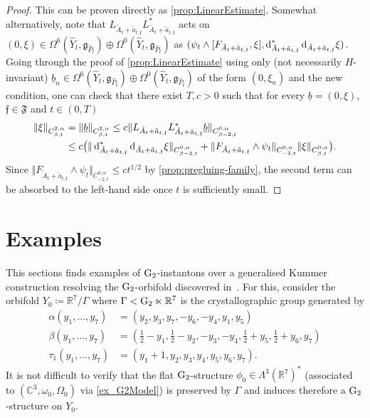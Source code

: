 \documentclass[11pt,a4paper]{scrartcl}
\newcommand*\diff{\mathop{}\!\textup{d}}
\newcommand{\VertWHt}[3]{\Vert_{C^{{#1},\alpha}_{{#2},t}{#3}}}
\newcommand{\G}{\textup{G}}
\numberwithin{equation}{section}
\theoremstyle{plain}
\theoremstyle{definition}
\theoremstyle{remark}
\begin{document}
\begin{proof}
This can be proven directly as \autoref{prop:LinearEstimate}. Somewhat alternatively, note that $L_{\tilde{A}_t+\tilde{a}_{t,\mathfrak{f}}}L_{\tilde{A}_t+\tilde{a}_{t,\mathfrak{f}}}^*$ acts on $(0,\xi)\in\Omega^6(\hat{Y}_t,\mathfrak{g}_{\hat{P}_t})\oplus \Omega^0(\hat{Y}_t,\mathfrak{g}_{\hat{P}_t})$ as $(\psi_t \wedge [F_{\tilde{A}_t+\tilde{a}_{t,\mathfrak{f}}},\xi],\diff_{\tilde{A}_t+\tilde{a}_{t,\mathfrak{f}}}^*\diff_{\tilde{A}_t+\tilde{a}_{t,\mathfrak{f}}} \xi)$. Going through the proof of \autoref{prop:LinearEstimate} using only (not necessarily $H$-invariant) $\underline{b}_n \in \Omega^6(\hat{Y}_t,\mathfrak{g}_{\hat{P}_t})\oplus \Omega^0(\hat{Y}_t,\mathfrak{g}_{\hat{P}_t})$ of the form $(0,\xi_n)$ and the new condition, one can check that there exist $T,c>0$ such that for every $\underline{b}=(0,\xi)$, $\mathfrak{f} \in \mathfrak{F}$ and $t\in(0,T)$ \begin{align*}
\Vert \xi \VertWHt{2}{\beta}{}&=\Vert \underline{b} \VertWHt{2}{\beta}{} \leq c \Vert L_{\tilde{A}_t+\tilde{a}_{t,\mathfrak{f}}}L_{\tilde{A}_t+\tilde{a}_{t,\mathfrak{f}}}^*\underline{b} \VertWHt{0}{\beta-2}{} \\
& \leq c \big(\Vert \diff^*_{\tilde{A}_t+\tilde{a}_{t,\mathfrak{f}}}\diff_{\tilde{A}_t+\tilde{a}_{t,\mathfrak{f}}}\xi \VertWHt{0}{\beta-2}{} + \Vert F_{\tilde{A}_t+\tilde{a}_{t,\mathfrak{f}}}\wedge\psi_t \VertWHt{0}{-2}{}\Vert \xi \VertWHt{0}{\beta}{}\big). 
\end{align*} 
Since $\Vert F_{\tilde{A}_t+\tilde{a}_{t,\mathfrak{f}}}\wedge\psi_t \VertWHt{0}{-2}{} \leq c t^{1/2}$ by \autoref{prop:pregluing-family}, the second term can be absorbed to the left-hand side once $t$ is sufficiently small.
\end{proof}


\section{Examples}\label{sec:Example18}

This sections finds examples of $\G_2$-instantons over a generalised Kummer construction resolving the $\G_2$-orbifold discovered in~\cite[Example~18]{Joyce-GeneralisedKummer2}. For this, consider the orbifold $Y_0 \coloneqq \mathbb{R}^7/\Gamma$ where $\Gamma< \G_2 \ltimes \mathbb{R}^7$ is the crystallographic group generated by 
\begin{align*}
\alpha(y_1,\dots,y_7) &= (y_2,y_3,y_7,-y_6,-y_4,y_1,y_5) \\
\beta(y_1,\dots,y_7) &= (\tfrac{1}{2} - y_1, \tfrac{1}{2} - y_2, -y_3, -y_4, \tfrac{1}{2} + y_5, \tfrac{1}{2} + y_6, y_7)\\
\tau_1 (y_1,\dots,y_7) &= (y_1+1,y_2,y_3,y_4,y_5,y_6,y_7).
\end{align*}
It is not difficult to verify that the flat $\G_2$-structure $\phi_0\in \Lambda^3(\mathbb{R}^7)^*$ (associated to $(\mathbb{C}^3,\omega_0,\Omega_0)$ via \autoref{ex_G2Model}) is preserved by $\Gamma$ and induces therefore a $\G_2$-structure on $Y_0$.
\end{document}
